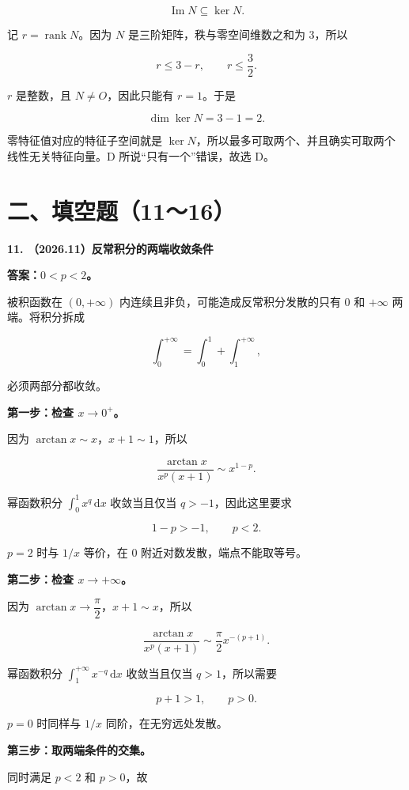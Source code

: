 \documentclass[UTF8,11pt,fontset=windows]{ctexart}
\begin{document}
$$
\operatorname{Im}N\subseteq\ker N.
$$

记 $r=\operatorname{rank}N$。因为 $N$ 是三阶矩阵，秩与零空间维数之和为 $3$，所以

$$
r\le3-r,
\qquad r\le\frac32.
$$

$r$ 是整数，且 $N\ne O$，因此只能有 $r=1$。于是

$$
\dim\ker N=3-1=2.
$$

零特征值对应的特征子空间就是 $\ker N$，所以最多可取两个、并且确实可取两个线性无关特征向量。D 所说“只有一个”错误，故选 D。

\clearpage

\section*{二、填空题（11～16）}

\textbf{11. （2026.11）反常积分的两端收敛条件}

\textbf{答案：$0<p<2$。}

被积函数在 $(0,+\infty)$ 内连续且非负，可能造成反常积分发散的只有 $0$ 和 $+\infty$ 两端。将积分拆成

$$
\int_0^{+\infty}=\int_0^1+\int_1^{+\infty},
$$

必须两部分都收敛。

\textbf{第一步：检查 $x\to0^+$。}

因为 $\arctan x\sim x$，$x+1\sim1$，所以

$$
\frac{\arctan x}{x^p(x+1)}\sim x^{1-p}.
$$

幂函数积分 $\int_0^1x^q\,\mathrm{d}x$ 收敛当且仅当 $q>-1$，因此这里要求

$$
1-p>-1,\qquad p<2.
$$

$p=2$ 时与 $1/x$ 等价，在 $0$ 附近对数发散，端点不能取等号。

\textbf{第二步：检查 $x\to+\infty$。}

因为 $\arctan x\to\dfrac\pi2$，$x+1\sim x$，所以

$$
\frac{\arctan x}{x^p(x+1)}
\sim\frac\pi2x^{-(p+1)}.
$$

幂函数积分 $\int_1^{+\infty}x^{-q}\,\mathrm{d}x$ 收敛当且仅当 $q>1$，所以需要

$$
p+1>1,\qquad p>0.
$$

$p=0$ 时同样与 $1/x$ 同阶，在无穷远处发散。

\textbf{第三步：取两端条件的交集。}

同时满足 $p<2$ 和 $p>0$，故
\end{document}
